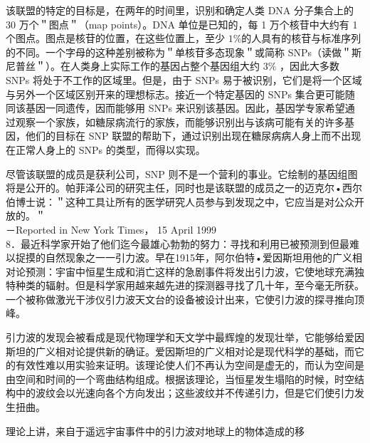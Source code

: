 该联盟的特定的目标是，在两年的时间里，识别和确定人类 DNA 分子集合上的 30 万个＂图点＂（map points）。DNA 单位是已知的，每 1 万个核苷中大约有 1 个图点。图点是核苷的位置，在这些位置上，至少 $1 \%$的人具有的核苷与标准序列的不同。一个字母的这种差别被称为＂单核苷多态现象＂或简称 SNPs（读做＂斯尼普丝＂）。在人类身上实际工作的基因占整个基因组大约 $3 \%$ ，因此大多数 SNPs 将处于不工作的区域里。但是，由于 SNPs 易于被识别，它们是将一个区域与另外一个区域区别开来的理想标志。接近一个特定基因的 SNPs 集合更可能随同该基因一同遗传，因而能够用 SNPs 来识别该基因。因此，基因学专家希望通过观察一个家族，如糖尿病流行的家族，而能够识别出与该病可能有关的许多基因，他们的目标在 SNP 联盟的帮助下，通过识别出现在糖尿病病人身上而不出现在正常人身上的 SNPs 的类型，而得以实现。

尽管该联盟的成员是获利公司，SNP 则不是一个营利的事业。它绘制的基因组图将是公开的。帕菲泽公司的研究主任，同时也是该联盟的成员之一的迈克尔•西尔伯博士说：＂这种工具让所有的医学研究人员参与到发现之中，它应当是对公众开放的。＂\\
－Reported in New York Times， 15 April 1999\\
8．最近科学家开始了他们迄今最雄心勃勃的努力：寻找和利用已被预测到但最难以捉摸的自然现象之一一引力波。早在1915年，阿尔伯特•爱因斯坦用他的广义相对论预测：宇宙中恒星生成和消亡这样的急剧事件将发出引力波，它使地球充满独特种类的辐射。但是科学家用越来越先进的探测器寻找了几十年，至今毫无所获。一个被称做激光干涉仪引力波天文台的设备被设计出来，它使引力波的探寻推向顶峰。

引力波的发现会被看成是现代物理学和天文学中最辉煌的发现壮举，它能够给爱因斯坦的广义相对论提供新的确证。爱因斯坦的广义相对论是现代科学的基础，而它的有效性难以用实验来证明。该理论使人们不再认为空间是虚无的，而认为空间是由空间和时间的一个弯曲结构组成。根据该理论，当恒星发生塌陷的时候，时空结构中的波纹会以光速向各个方向发出；这些波纹并不传递引力，但是它们使引力发生扭曲。

理论上讲，来自于遥远宇宙事件中的引力波对地球上的物体造成的移

